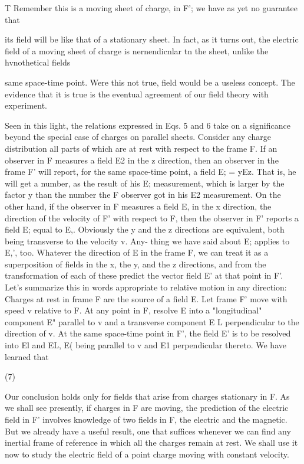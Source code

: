 T Remember this is a moving sheet of charge, in F'; we have as yet no guarantee that

its field will be like that of a stationary sheet. In fact, as it turns out, the electric field
of a moving sheet of charge is nernendicnlar tn the sheet, unlike the hvnothetical fields

same space-time point. Were this not true, field would be a useless
concept. The evidence that it is true is the eventual agreement of
our field theory with experiment.

Seen in this light, the relations expressed in Eqs. 5 and 6 take on
a significance beyond the special case of charges on parallel sheets.
Consider any charge distribution all parts of which are at rest with
respect to the frame F. If an observer in F measures a field E2 in the
z direction, then an observer in the frame F' will report, for the same
space-time point, a field E; = yEz. That is, he will get a number, as
the result of his E; measurement, which is larger by the factor y than
the number the F observer got in his E2 measurement. On the
other hand, if the observer in F measures a field E, in the x direction,
the direction of the velocity of F' with respect to F, then the observer
in F' reports a field E; equal to E,. Obviously the y and the z directions
are equivalent, both being transverse to the velocity v. Any-
thing we have said about E; applies to E,', too. Whatever the direction
of E in the frame F, we can treat it as a superposition of fields in
the x, the y, and the z directions, and from the transformation of each
of these predict the vector field E' at that point in F'. Let's summarize
this in words appropriate to relative motion in any direction:
Charges at rest in frame F are the source of a field E. Let frame F'
move with speed v relative to F. At any point in F, resolve E into a
"longitudinal" component E" parallel to v and a transverse component
E L perpendicular to the direction of v. At the same space-time
point in F', the field E' is to be resolved into El and EL, E( being
parallel to v and E1 perpendicular thereto. We have learned that

\begin{equation}
\end{equation}
(7)

 

Our conclusion holds only for fields that arise from charges stationary
in F. As we shall see presently, if charges in F are moving, the prediction
of the electric field in F' involves knowledge of two fields in F,
the electric and the magnetic. But we already have a useful result,
one that suffices whenever we can find any inertial frame of reference
in which all the charges remain at rest. We shall use it now to study
the electric field of a point charge moving with constant velocity.

